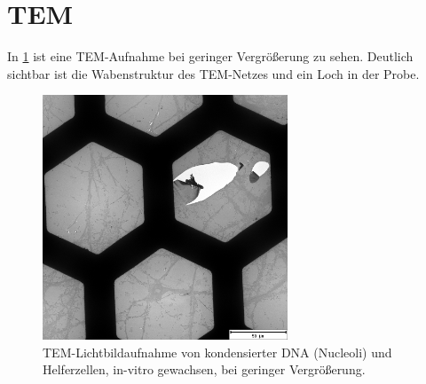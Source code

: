 \section{TEM}



In \cref{fig:tem:waben} ist eine TEM-Aufnahme bei geringer Vergrößerung zu sehen.
Deutlich sichtbar ist die Wabenstruktur des TEM-Netzes und ein Loch in der Probe. %

\begin{figure}[!ht]
    \centering
    \includegraphics[width=0.65\textwidth]{img/TEM/1_low_mag_artifacts.jpg}
    \caption{TEM-Lichtbildaufnahme von kondensierter DNA (Nucleoli) und Helferzellen, in-vitro gewachsen, bei geringer Vergrößerung.}
    \label{fig:tem:waben}
\end{figure}

